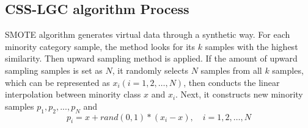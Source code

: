 \documentclass{svjour3}                     %
\begin{document}
\subsection{CSS-LGC algorithm Process}\label{subsec:css-lgc-pro}
 SMOTE algorithm generates virtual data through a synthetic way. For each minority category sample, the method looks for its $k$ samples with the highest similarity. Then upward sampling method is applied. If the amount of upward sampling samples is set as $N$, it randomly selects $N$ samples from all $k$ samples, which can be represented as ${x_i}\left( {i = 1,2, \ldots ,N} \right)$, then conducts the linear interpolation between minority class $x$ and $x_i$. Next, it constructs new minority samples ${p_1},{p_2},...,{p_N}$ and 
 \begin{equation}\label{formula:init}
  {p_i} = x + rand(0,1)*({x_i} - x), \quad i = 1,2,\ldots,N
 \end{equation}
\end{document}
